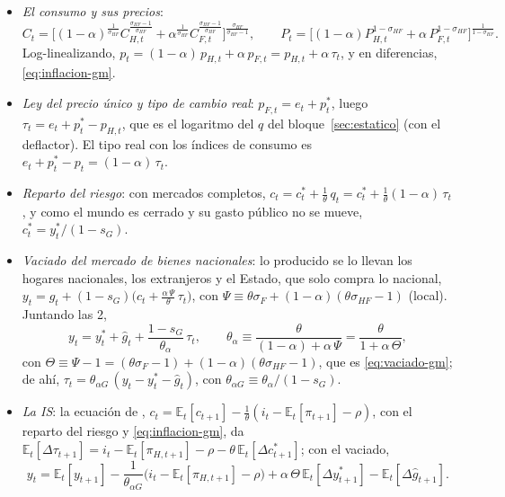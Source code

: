 \documentclass[11pt]{article}
\begin{document}
\begin{itemize}
  \begin{itemize}
  \item \emph{El consumo y sus precios}:
  \begin{equation*}
  C_t=\Big[(1-\alpha)^{\frac{1}{\sigma_{HF}}}C_{H,t}^{\frac{\sigma_{HF}-1}{\sigma_{HF}}}+\alpha^{\frac{1}{\sigma_{HF}}}C_{F,t}^{\frac{\sigma_{HF}-1}{\sigma_{HF}}}\Big]^{\frac{\sigma_{HF}}{\sigma_{HF}-1}},\qquad P_t=\Big[(1-\alpha)P_{H,t}^{1-\sigma_{HF}}+\alpha\,P_{F,t}^{1-\sigma_{HF}}\Big]^{\frac{1}{1-\sigma_{HF}}}.
  \end{equation*}
  Log-linealizando, $p_t=(1-\alpha)\,p_{H,t}+\alpha\,p_{F,t}=p_{H,t}+\alpha\,\tau_t$, y en diferencias, \eqref{eq:inflacion-gm}.
  \item \emph{Ley del precio único y tipo de cambio real}: $p_{F,t}=e_t+p^*_t$, luego $\tau_t=e_t+p^*_t-p_{H,t}$, que es el logaritmo del $q$ del bloque~\ref{sec:estatico} (con el deflactor). El tipo real con los índices de consumo es $e_t+p^*_t-p_t=(1-\alpha)\,\tau_t$.
  \item \emph{Reparto del riesgo}: con mercados completos, $c_t=c^*_t+\frac{1}{\theta}\,q_t=c^*_t+\frac{1}{\theta}(1-\alpha)\,\tau_t$, y como el mundo es cerrado y su gasto público no se mueve, $c^*_t=y^*_t/(1-s_G)$.
  \item \emph{Vaciado del mercado de bienes nacionales}: lo producido se lo llevan los hogares nacionales, los extranjeros y el Estado, que solo compra lo nacional, $y_t=\hat g_t+(1-s_G)\big(c_t+\frac{\alpha\,\Psi}{\theta}\,\tau_t\big)$, con $\Psi\equiv\theta\sigma_F+(1-\alpha)(\theta\sigma_{HF}-1)$ (local). Juntando las 2,
  \begin{equation*}
  y_t=y^*_t+\hat g_t+\frac{1-s_G}{\theta_{\alpha}}\,\tau_t,\qquad \theta_{\alpha}\equiv\frac{\theta}{(1-\alpha)+\alpha\,\Psi}=\frac{\theta}{1+\alpha\,\Theta},
  \end{equation*}
  con $\Theta\equiv\Psi-1=(\theta\sigma_F-1)+(1-\alpha)(\theta\sigma_{HF}-1)$, que es \eqref{eq:vaciado-gm}; de ahí, $\tau_t=\theta_{\alpha G}\,(y_t-y^*_t-\hat g_t)$, con $\theta_{\alpha G}\equiv\theta_\alpha/(1-s_G)$.
  \item \emph{La IS}: la ecuación de , $c_t=\mathbb{E}_t[c_{t+1}]-\frac1\theta(i_t-\mathbb{E}_t[\pi_{t+1}]-\rho)$, con el reparto del riesgo y \eqref{eq:inflacion-gm}, da $\mathbb{E}_t[\Delta\tau_{t+1}]=i_t-\mathbb{E}_t[\pi_{H,t+1}]-\rho-\theta\,\mathbb{E}_t[\Delta c^*_{t+1}]$; con el vaciado,
  \begin{equation*}
  y_t=\mathbb{E}_t[y_{t+1}]-\frac{1}{\theta_{\alpha G}}\big(i_t-\mathbb{E}_t[\pi_{H,t+1}]-\rho\big)+\alpha\,\Theta\,\mathbb{E}_t[\Delta y^*_{t+1}]-\mathbb{E}_t[\Delta\hat g_{t+1}] .

\end{equation*}
\end{itemize}
\end{itemize}
\end{document}

